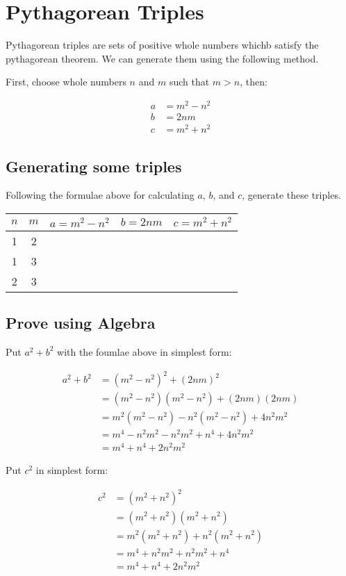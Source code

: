 \documentclass[12pt,letterpaper]{article}
\begin{document}
\section*{Pythagorean Triples}

Pythagorean triples are sets of positive whole numbers whichb satisfy the pythagorean theorem.
We can generate them using the following method.

\noindent First, choose whole numbers $n$ and $m$ such that $m > n$, then:

\begin{align*} 
a &= m^2 - n^2 \\
b &= 2nm \\
c &= m^2 + n^2 
\end{align*}

\subsection*{Generating some triples}

Following the formulae above for calculating $a$, $b$, and $c$, generate these triples.

\begin{table}[ht]
  \begin{tabular}{c|c|c|c|c}
     $n$ & $m$ & $a = m^2 - n^2$ & $b = 2nm$ & $c = m^2 + n^2$ \\
      \hline
      1  &  2  &   &   &   \\
      1  &  3  &   &   &   \\
      2  &  3  &   &   &   \\
  \end{tabular}
\end{table}

\subsection*{Prove using Algebra}

Put $a^2 + b^2$ with the foumlae above in simplest form:

\begin{align*}
 a^2 + b^2 &= (m^2 -n^2)^2 + (2nm)^2 \\
           &= (m^2 - n^2)(m^2 - n^2) + (2nm)(2nm) \\
           &= m^2(m^2 - n^2) - n^2(m^2 - n^2) + 4n^2m^2 \\
           &= m^4 - n^2m^2  -n^2m^2 + n^4 + 4n^2m^2 \\
           &= m^4 + n^4 + 2n^2m^2
\end{align*}

\noindent Put $c^2$ in simplest form:

\begin{align*}
 c^2 &= (m^2 + n^2)^2 \\
     &= (m^2 + n^2)(m^2 + n^2) \\
     &= m^2(m^2 + n^2) + n^2(m^2 + n^2) \\
     &= m^4 + n^2m^2 + n^2m^2 + n^4 \\
     &= m^4 + n^4 + 2n^2m^2
\end{align*}
\end{document}
